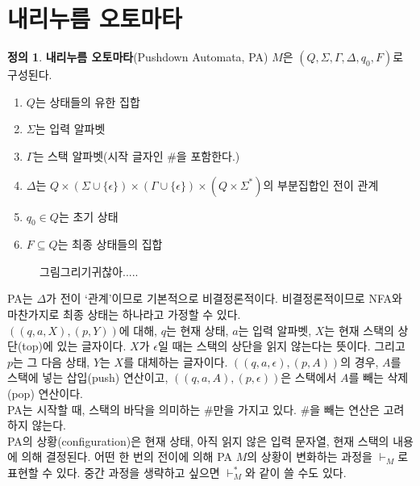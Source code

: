 \documentclass[b5paper, 11pt]{book}
\theoremstyle{definition}
\newtheorem{defn}{정의}[chapter]
\begin{document}
\section{내리누름 오토마타}
\begin{defn}
    \textbf{내리누름 오토마타}(Pushdown Automata, PA) $M$은 $(Q, \Sigma, 
    \Gamma, \Delta, q_0, F)$로 구성된다. 
    \begin{enumerate}
        \item $Q$는 상태들의 유한 집합
        \item $\Sigma$는 입력 알파벳
        \item $\Gamma$는 스택 알파벳(시작 글자인 \#을 포함한다.)
        \item $\Delta$는 $Q \times (\Sigma \cup \{\epsilon\}) \times (\Gamma \cup \{\epsilon\}) \times (Q \times \Sigma^*)$의 부분집합인 전이 관계
        \item $q_0 \in Q$는 초기 상태
        \item $F \subseteq Q$는 최종 상태들의 집합
    \end{enumerate}
\end{defn}
\begin{figure}[!ht]
    \centering
    \caption{그림그리기귀찮아.....}
\end{figure}
PA는 $\Delta$가 전이 `관계'이므로 기본적으로 비결정론적이다. 비결정론적이므로 NFA와 마찬가지로 최종 상태는 하나라고 가정할 수 있다. \\ 
$((q, a, X), (p, Y))$에 대해, $q$는 현재 상태, $a$는 입력 알파벳, $X$는 현재 스택의 상단(top)에 있는 글자이다. $X$가 $\epsilon$일 때는 스택의 상단을 읽지 않는다는 뜻이다. 그리고 $p$는 그 다음 상태, $Y$는 $X$를 대체하는 글자이다. $((q,a,\epsilon),(p,A))$의 경우, $A$를 스택에 넣는 삽입(push) 연산이고, $((q,a,A),(p,\epsilon))$은 스택에서 $A$를 빼는 삭제(pop) 연산이다. \\
PA는 시작할 때, 스택의 바닥을 의미하는 \#만을 가지고 있다. \#을 빼는 연산은 고려하지 않는다. \\ 
PA의 상황(configuration)은 현재 상태, 아직 읽지 않은 입력 문자열, 현재 스택의 내용에 의해 결정된다. 어떤 한 번의 전이에 의해 PA $M$의 상황이 변화하는 과정을 $\vdash_M$로 표현할 수 있다. 중간 과정을 생략하고 싶으면 $\vdash_M^*$와 같이 쓸 수도 있다. \\ 
\end{document}
